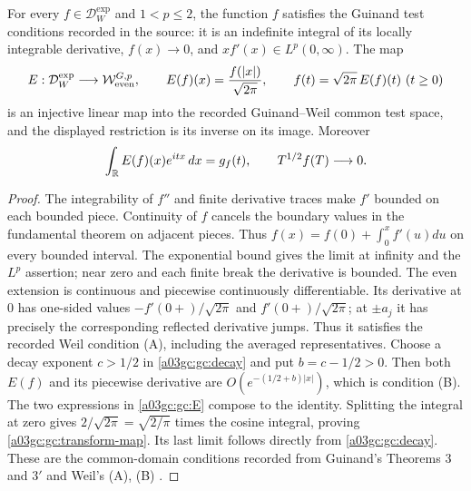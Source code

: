 \begin{proposition}
For every $f\in\mathcal D_W^{\exp}$ and $1<p\le2$, the function $f$
satisfies the Guinand test conditions recorded in the source:
it is an indefinite integral of its locally integrable derivative,
$f(x)\to0$, and $xf'(x)\in L^p(0,\infty)$.
The map
\begin{equation}
 E:\mathcal D_W^{\exp}\longrightarrow
       \mathcal W_{\rm even}^{G,p},\qquad
 E(f)(x)=\frac{f(|x|)}{\sqrt{2\pi}},
 \qquad f(t)=\sqrt{2\pi}\,E(f)(t)\ (t\ge0)
 \label{a03gc:gc:E}
\end{equation}
is an injective linear map into the recorded Guinand--Weil common test
space, and the displayed restriction is its inverse on its image.
Moreover
\begin{equation}
 \int_\mathbb R E(f)(x)e^{itx}\,dx=g_f(t),\qquad
 T^{1/2}f(T)\longrightarrow0.
 \label{a03gc:gc:transform-map}
\end{equation}
\end{proposition}
\begin{proof}
The integrability of $f''$ and finite derivative traces make $f'$ bounded
on each bounded piece.  Continuity of $f$ cancels the boundary values in
the fundamental theorem on adjacent pieces.  Thus
$f(x)=f(0)+\int_0^x f'(u)du$ on every bounded interval.
The exponential bound gives the limit at infinity and the $L^p$ assertion;
near zero and each finite break the derivative is bounded.
The even extension is continuous and piecewise continuously
differentiable.  Its derivative at $0$ has one-sided values
$-f'(0+)/\sqrt{2\pi}$ and $f'(0+)/\sqrt{2\pi}$; at $\pm a_j$ it
has precisely the corresponding reflected derivative jumps.  Thus it
satisfies the recorded Weil condition (A), including the averaged
representatives.  Choose a decay exponent $c>1/2$ in \eqref{a03gc:gc:decay} and
put $b=c-1/2>0$.  Then both $E(f)$ and its piecewise derivative are
$O(e^{-(1/2+b)|x|})$, which is condition (B).
The two expressions in \eqref{a03gc:gc:E} compose to the identity.  Splitting
the integral at zero gives
$2/\sqrt{2\pi}=\sqrt{2/\pi}$ times the cosine integral, proving
\eqref{a03gc:gc:transform-map}.  Its last limit follows directly from
\eqref{a03gc:gc:decay}.  These are the common-domain conditions recorded from
Guinand's Theorems 3 and $3'$ and Weil's (A), (B)
\cite[pp.~112--115]{a03gc:guinand1948}\cite[Collected Papers II, pp.~52--58]{a03gc:weil1952}.
\end{proof}


